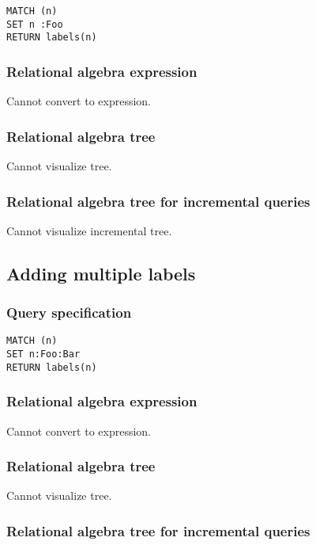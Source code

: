 \begin{lstlisting}
MATCH (n)
SET n :Foo
RETURN labels(n)
\end{lstlisting}

\subsubsection*{Relational algebra expression}

Cannot convert to expression.

\subsubsection*{Relational algebra tree}

Cannot visualize tree.

\subsubsection*{Relational algebra tree for incremental queries}

Cannot visualize incremental tree.

\subsection{Adding multiple labels}

\subsubsection*{Query specification}

\begin{lstlisting}
MATCH (n)
SET n:Foo:Bar
RETURN labels(n)
\end{lstlisting}

\subsubsection*{Relational algebra expression}

Cannot convert to expression.

\subsubsection*{Relational algebra tree}

Cannot visualize tree.

\subsubsection*{Relational algebra tree for incremental queries}

